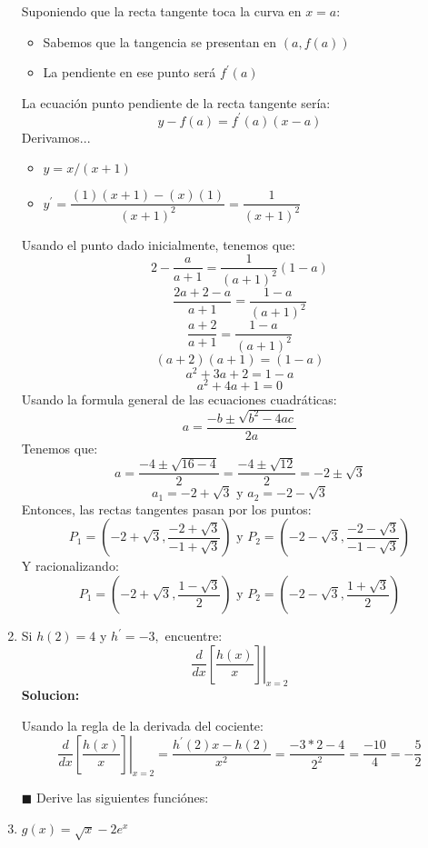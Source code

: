 \documentclass{article}
\begin{document}
\begin{enumerate}[start=5, label=\textbf{\arabic*.}]
    Suponiendo que la recta tangente toca la curva en $x=a$:
    \begin{itemize}
        \item Sabemos que la tangencia se presentan en $(a,f(a))$
        \item La pendiente en ese punto será $f^{\prime}(a)$
    \end{itemize}
    La ecuación punto pendiente de la recta tangente sería:
    \[
        y - f(a) = f^{\prime}(a)(x-a)
    \]
    Derivamos...
    \begin{itemize}    
        \item  $y = x/(x+1)$
        \item  $y^{\prime} = \dfrac{(1)(x+1) - (x)(1)}{(x+1)^2} = \dfrac{1}{(x+1)^2}$
    \end{itemize}
    Usando el punto dado inicialmente, tenemos que:
    \[
        2 - \dfrac{a}{a+1} = \dfrac{1}{(a+1)^2}(1-a)
    \]
    \[
        \dfrac{2a+2-a}{a+1} = \dfrac{1-a}{(a+1)^2}
    \]
    \[
        \dfrac{a+2}{a+1} = \dfrac{1-a}{(a+1)^2}
    \]
    \[
        (a+2)(a+1) = (1-a)
    \]
    \[
        a^2 + 3a + 2 = 1-a
    \]
    \[
        a^2 + 4a + 1 = 0
    \]
    Usando la formula general de las ecuaciones cuadráticas:
    \[
        a = \dfrac{-b \pm \sqrt{b^2 - 4ac}}{2a}
    \]
    Tenemos que:
    \[
        a = \dfrac{-4 \pm \sqrt{16 - 4}}{2} = \dfrac{-4 \pm \sqrt{12}}{2} = -2 \pm \sqrt{3}
    \]
    \[
        a_1 = -2 + \sqrt{3} \text{ y } a_2 = -2 - \sqrt{3}
    \]
    Entonces, las rectas tangentes pasan por los puntos:
    \[
        P_1 = (-2+\sqrt{3}, \dfrac{-2+\sqrt{3}}{-1+\sqrt{3}}) \text{ y }  P_2 = (-2-\sqrt{3}, \dfrac{-2-\sqrt{3}}{-1-\sqrt{3}})
    \]
    Y racionalizando:
    \[
        P_1 = (-2+\sqrt{3},  \dfrac{1-\sqrt{3}}{2}) \text{ y }  P_2 = (-2-\sqrt{3}, \dfrac{1+\sqrt{3}}{2})
    \]
    \item Si $h(2) = 4$ y $h^{\prime}  = -3,$ encuentre:
    \[
        \left.\dfrac{d}{dx}\left[\dfrac{h(x)}{x}\right]\right|_{x=2}
    \]
    \textbf{Solucion: }

    Usando la regla de la derivada del cociente:
    \[
        \left.\dfrac{d}{dx}\left[\dfrac{h(x)}{x}\right]\right|_{x=2} = \dfrac{h^{\prime}(2)x - h(2)}{x^2} = \dfrac{-3*2 - 4}{2^2} = \dfrac{-10}{4} = -\dfrac{5}{2}
    \]
    \par\vspace{2em}
    $\blacksquare$ Derive las siguientes funciónes:
    \vspace{1em}
    \item $g(x) = \sqrt{x}-2e^x$
    

\end{enumerate}
\end{document}
